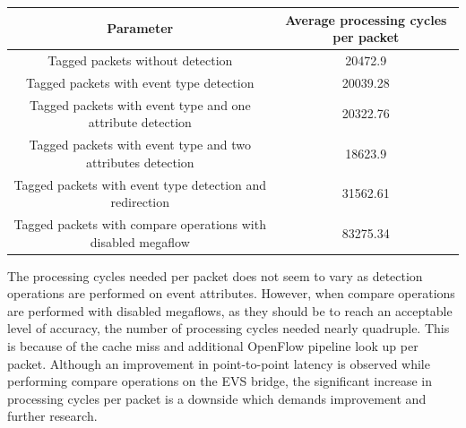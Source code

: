  
\begin{center}
  \label{tab:title} 
 \begin{tabular}{ |c|c| }
  \hline
  \textbf{Parameter} &  \textbf{Average processing cycles per packet} \\\toprule
  \hline
  Tagged packets without detection  &  20472.9 \\
  \hline 
  Tagged packets with event type detection  & 20039.28 \\
  \hline  
  Tagged packets with event type and one attribute detection  &  20322.76  \\ 
  \hline
  Tagged packets with event type and two attributes detection  &  18623.9  \\ 
  \hline  
  Tagged packets with event type detection and redirection  &  31562.61  \\ 
  \hline  
  Tagged packets with compare operations with disabled megaflow   &  83275.34  \\\bottomrule  
 \end{tabular}
\end{center} 


The processing cycles needed per packet does not seem to vary as detection operations are performed on event attributes. However, when compare operations are performed with disabled megaflows, as they should be to reach an acceptable level of accuracy, the number of processing cycles needed nearly quadruple. This is because of the cache miss and additional OpenFlow pipeline look up per packet. Although an improvement in point-to-point latency is observed while performing compare operations on the EVS bridge, the significant increase in processing cycles per packet is a downside which demands improvement and further research.


